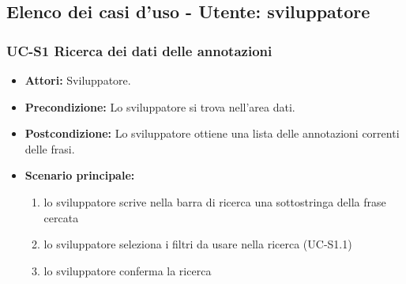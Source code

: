 \subsection{Elenco dei casi d'uso - Utente: sviluppatore}	

\subsubsection{UC-S1 Ricerca dei dati delle annotazioni}
		\begin{itemize}
			\item \textbf{Attori:} Sviluppatore.
			\item \textbf{Precondizione:} Lo sviluppatore si trova nell'area dati.
			\item \textbf{Postcondizione:} Lo sviluppatore ottiene una lista delle annotazioni correnti delle frasi.
			\item \textbf{Scenario principale:}
				\begin{enumerate}
					\item lo sviluppatore scrive nella barra di ricerca una sottostringa della frase cercata
					\item lo sviluppatore seleziona i filtri da usare nella ricerca (UC-S1.1)
					\item lo sviluppatore conferma la ricerca
				\end{enumerate}
		\end{itemize}
	
